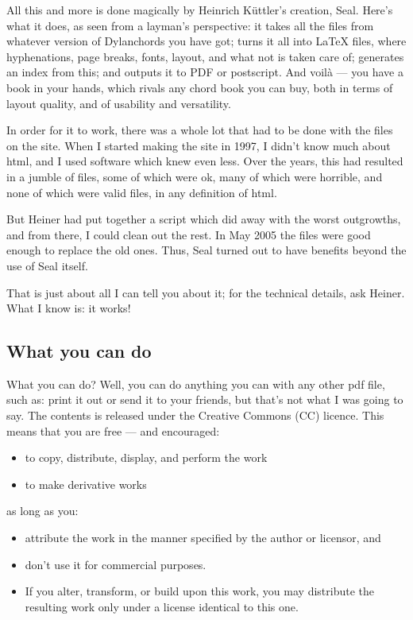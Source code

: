 \begin{articlelayout}
All this and more is done magically by Heinrich K\"uttler's creation,
Seal. Here's what it does, as seen from a layman's perspective: it
takes all the files from whatever version of Dylanchords you have got;
turns it all into LaTeX files, where hyphenations, page breaks, fonts,
layout, and what not is taken care of; generates an index from this;
and outputs it to PDF or postscript. And voil\`a --- you have a book
in your hands, which rivals any chord book you can buy, both in terms
of layout quality, and of usability and versatility.
 
In order for it to work, there was a whole lot that had to be done
with the files on the site. When I started making the site in 1997, I
didn't know much about html, and I used software which knew even
less. Over the years, this had resulted in a jumble of files, some of
which were ok, many of which were horrible, and none of which were
valid files, in any definition of html.
 
But Heiner had put together a script which did away with the worst
outgrowths, and from there, I could clean out the rest. In May 2005
the files were good enough to replace the old ones. Thus, Seal turned
out to have benefits beyond the use of Seal itself.
 
That is just about all I can tell you about it; for the technical
details, ask Heiner. What I know is: it works!

\subsection*{What you can do}
 
What you can do? Well, you can do anything you can with any other pdf
file, such as: print it out or send it to your friends, but that's not
what I was going to say. The contents is released under the Creative
Commons (CC) licence. This means that you are free --- and encouraged:

\begin{itemize}
  \item to copy, distribute, display, and perform the work
  \item to make derivative works
\end{itemize}

as long as you:
\begin{itemize}
  \item attribute the work in the manner specified by the author or
    licensor, and
  \item don't use it for commercial purposes.
  \item If you alter, transform, or build upon this work, you may
    distribute the resulting work only under a license identical to
    this one.
\end{itemize}
 

\end{articlelayout}
